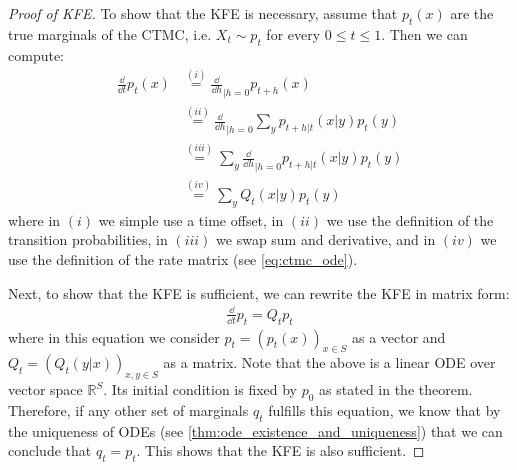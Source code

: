 \begin{proof}[Proof of KFE]
To show that the KFE is necessary, assume that $p_t(x)$ are the true marginals of the CTMC, i.e. $X_t\sim p_t$ for every $0\leq t\leq 1$. Then we can compute:
\begin{align*}
\frac{\dd}{\dd t}p_t(x)&\overset{(i)}{=}\frac{\dd}{\dd h}_{|h=0}p_{t+h}(x)\\
&\overset{(ii)}{=}\frac{\dd}{\dd h}_{|h=0}\sum\limits_{y}p_{t+h|t}(x|y)p_t(y)\\
&\overset{(iii)}{=}\sum\limits_{y}\frac{\dd}{\dd h}_{|h=0}p_{t+h|t}(x|y)p_t(y)\\
&\overset{(iv)}{=}\sum\limits_{y}Q_t(x|y)p_t(y)
\end{align*}
where in $(i)$ we simple use a time offset, in $(ii)$ we use the definition of the transition probabilities, in $(iii)$ we swap sum and derivative, and in $(iv)$ we use the definition of the rate matrix (see \cref{eq:ctmc_ode}).

Next, to show that the KFE is sufficient, we can rewrite the KFE in matrix form:
\begin{align*}
\frac{\dd}{\dd t}p_t = Q_tp_t
\end{align*}
where in this equation we consider $p_t=(p_t(x))_{x\in S}$ as a vector and $Q_t=(Q_t(y|x))_{x,y\in S}$ as a matrix. Note that the above is a linear ODE over vector space $\mathbb{R}^S$. Its initial condition is fixed by $p_0$ as stated in the theorem. Therefore, if any other set of marginals $q_t$ fulfills this equation, we know that by the uniqueness of ODEs (see \cref{thm:ode_existence_and_uniqueness}) that we can conclude that $q_t=p_t$. This shows that the KFE is also sufficient.
\end{proof}

